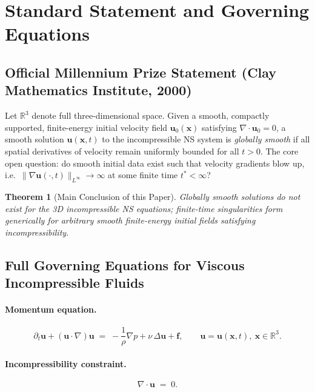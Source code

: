 \documentclass[11pt,a4paper]{article}
\newtheorem{theorem}{Theorem}
\theoremstyle{remark}
\newcommand{\uvec}{\bm{u}}
\newcommand{\pvec}{\bm{f}}
\begin{document}
\section{Standard Statement and Governing Equations}\label{sec:statement}

\subsection{Official Millennium Prize Statement (Clay Mathematics Institute, 2000)}\label{sec:clay}

Let $\mathbb{R}^{3}$ denote full three-dimensional space. Given a smooth, compactly supported, finite-energy initial velocity field $\uvec_{0}(\bm{x})$ satisfying $\nabla\!\cdot\!\uvec_{0}=0$, a smooth solution $\uvec(\bm{x},t)$ to the incompressible NS system is \emph{globally smooth} if all spatial derivatives of velocity remain uniformly bounded for all $t>0$. The core open question: do smooth initial data exist such that velocity gradients blow up, i.e.\ $\|\nabla\uvec(\cdot,t)\|_{L^{\infty}}\to\infty$ at some finite time $t^{*}<\infty$?

\begin{theorem}[Main Conclusion of this Paper]\label{thm:main}
Globally smooth solutions do not exist for the 3D incompressible NS equations; finite-time singularities form generically for arbitrary smooth finite-energy initial fields satisfying incompressibility.
\end{theorem}

\subsection{Full Governing Equations for Viscous Incompressible Fluids}\label{sec:governing}

\paragraph{Momentum equation.}
\begin{equation}\label{eq:ns-momentum}
\partial_{t}\uvec + (\uvec\!\cdot\!\nabla)\uvec \;=\; -\frac{1}{\rho}\nabla p + \nu\,\Delta\uvec + \pvec,
\qquad \uvec=\uvec(\bm{x},t),\ \bm{x}\in\mathbb{R}^{3}.
\end{equation}

\paragraph{Incompressibility constraint.}
\begin{equation}\label{eq:ns-incomp}
\nabla\!\cdot\!\uvec \;=\; 0.
\end{equation}
\end{document}
